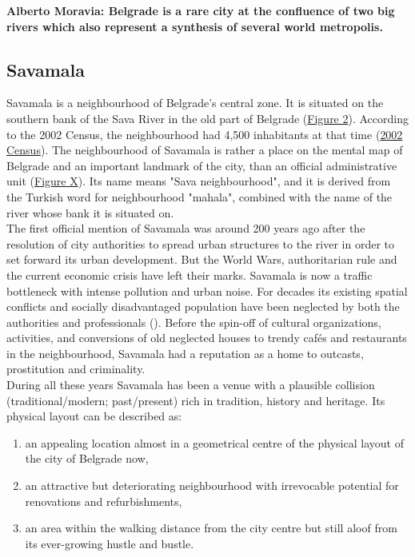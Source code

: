 \documentclass[11pt]{report}
\begin{document}
\textbf{Alberto Moravia: Belgrade is a rare city at the confluence of two big rivers which also represent a synthesis of several world metropolis.}

\subsection{Savamala}

Savamala is a neighbourhood of Belgrade's central zone. It is situated on the southern bank of the Sava River in the old part of Belgrade (\href{Figure 2}{Figure 2}).
According to the 2002 Census, the neighbourhood had 4,500 inhabitants at that time (\href{ref}{2002 Census}).
The neighbourhood of Savamala is rather a place on the mental map of Belgrade and an important landmark of the city, than an official administrative unit  (\href{Figure Savamala boarders}{Figure X}). Its name means "Sava neighbourhood", and it is derived from the Turkish word for neighbourhood "mahala", combined with the name of the river whose bank it is situated on.
\\

The first official mention of Savamala was around 200 years ago after the resolution of city authorities to spread urban structures to the river in order to set forward its urban development. But the World Wars, authoritarian rule and the current economic crisis have left their marks. Savamala is now a traffic bottleneck with intense pollution and urban noise. For decades its existing spatial conflicts and socially disadvantaged population have been neglected by both the authorities and professionals (\href{Urban}{\citealt{kamenzid_urban_2013}}).
Before the spin-off of cultural organizations, activities, and conversions of old neglected houses to trendy cafés and restaurants in the neighbourhood, Savamala had a reputation as a home to outcasts, prostitution and criminality.
\\
During all these years Savamala has been a venue with a plausible collision (traditional/modern; past/present) rich in tradition, history and heritage.
Its physical layout can be described as:

\begin{enumerate}
\item an appealing location almost in a geometrical centre of the physical layout of the city of Belgrade now,
\item an attractive but deteriorating neighbourhood with irrevocable potential for renovations and refurbishments,
\item an area within the walking distance from the city centre but still aloof from its ever-growing hustle and bustle.
\end{enumerate} 
\end{document}
